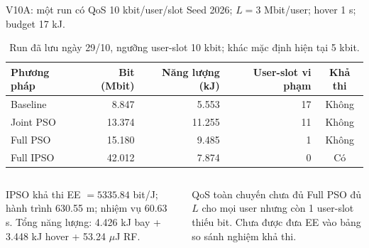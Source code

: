 \documentclass[t,aspectratio=169]{beamer}
\begin{document}
\begin{frame}{V10A: một run có QoS 10 kbit/user/slot}
\vspace{-8pt}
\small Seed 2026; $L=3$ Mbit/user; hover 1 s; budget 17 kJ.\par
\vspace{5pt}
\begin{table}
\centering\small
\begin{tabular}{@{}lrrrc@{}}
\toprule
Phương pháp & Bit (Mbit) & Năng lượng (kJ) & User-slot vi phạm & Khả thi\\
\midrule
Baseline & 8.847 & 5.553 & 17 & Không\\
Joint PSO & 13.374 & 11.255 & 11 & Không\\
Full PSO & 15.180 & 9.485 & 1 & Không\\
Full IPSO & 42.012 & 7.874 & 0 & Có\\
\bottomrule
\end{tabular}
\caption{Run đã lưu ngày 29/10, ngưỡng user-slot 10 kbit; khác mặc định hiện tại 5 kbit.}
\end{table}
\vspace{-8pt}
\begin{columns}[T]
\begin{block}{IPSO khả thi}\small
EE $=5335.84$ bit/J; hành trình 630.55 m; nhiệm vụ 60.63 s. Tổng năng lượng: 4.426 kJ bay + 3.448 kJ hover + 53.24 $\mu$J RF.
\end{block}
\begin{alertblock}{QoS toàn chuyến chưa đủ}\small
Full PSO đủ $L$ cho mọi user nhưng còn 1 user-slot thiếu bit. Chưa được đưa EE vào bảng so sánh nghiệm khả thi.
\end{alertblock}
\end{columns}
\end{frame}
\end{document}
